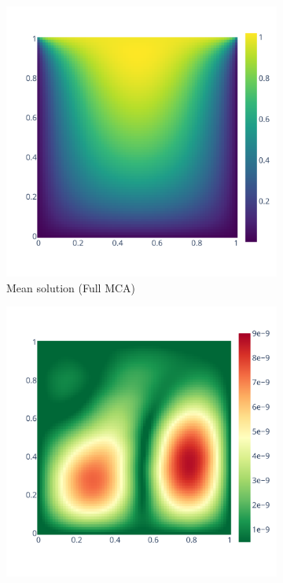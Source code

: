 \documentclass[11pt]{article}
\begin{document}
\begin{figure}
    \begin{subfigure}{0.45\linewidth}
    \includegraphics[width=\linewidth]{figure/root_finding/solution_mean_MCA.pdf}
    \caption{Mean solution (Full MCA)}
    \label{fig:mean_solution_mca}
    \end{subfigure}
    \begin{subfigure}{0.45\linewidth}
    \includegraphics[width=\linewidth]{figure/root_finding/solution_std_MCA.pdf}    

\end{subfigure}
\end{figure}
\end{document}
